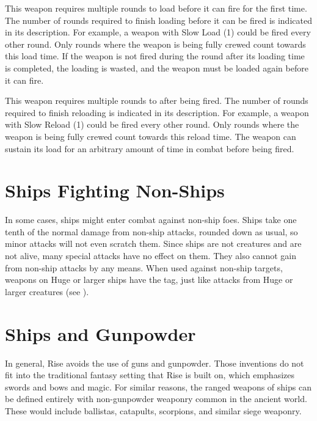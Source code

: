          This weapon requires multiple rounds to load before it can fire for the first time.
        The number of rounds required to finish loading before it can be fired is indicated in its description.
        For example, a weapon with Slow Load (1) could be fired every other round.
        Only rounds where the weapon is being fully crewed count towards this load time.
        If the weapon is not fired during the round after its loading time is completed, the loading is wasted, and the weapon must be loaded again before it can fire.

         This weapon requires multiple rounds to after being fired.
        The number of rounds required to finish reloading is indicated in its description.
        For example, a weapon with Slow Reload (1) could be fired every other round.
        Only rounds where the weapon is being fully crewed count towards this reload time.
        The weapon can sustain its load for an arbitrary amount of time in combat before being fired.

\section{Ships Fighting Non-Ships}
    In some cases, ships might enter combat against non-ship foes.
    Ships take one tenth of the normal damage from non-ship attacks, rounded down as usual, so minor attacks will not even scratch them.
    Since ships are not creatures and are not alive, many special attacks have no effect on them.
    They also cannot gain  from non-ship attacks by any means.
    When used against non-ship targets, weapons on Huge or larger ships have the  tag, just like attacks from Huge or larger creatures (see ).

\section{Ships and Gunpowder}
    In general, Rise avoids the use of guns and gunpowder.
    Those inventions do not fit into the traditional fantasy setting that Rise is built on, which emphasizes swords and bows and magic.
    For similar reasons, the ranged weapons of ships can be defined entirely with non-gunpowder weaponry common in the ancient world.
    These would include ballistas, catapults, scorpions, and similar siege weaponry.

